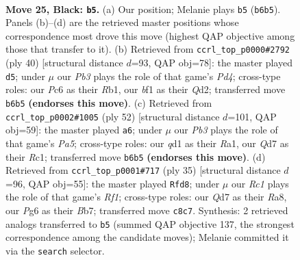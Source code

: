 \documentclass[11pt]{article}
\begin{document}
\clearpage

\begin{figure}[p]\centering
\begin{subfigure}{0.46\textwidth}\centering
\resizebox{\linewidth}{!}{%
\newchessgame
\chessboard[
  setfen={r1r2k2/pb1qb2p/npp3pP/3p1pP1/P2P1P2/1P2P1N1/8/R2QKBNR b KQ - 20 25},
  showmover=false,
  pgfstyle=straightmove, color=movearrow, markmove={b6-b5}
]}
\caption{}
\end{subfigure}\hfill
\begin{subfigure}{0.46\textwidth}\centering
\resizebox{\linewidth}{!}{%
\newchessgame
\chessboard[
  setfen={1nkr3r/2p2p2/bpqpp3/p5pn/2PPP2p/1NP2P1P/3QBBP1/1R2R1K1 w - - 1 21},
  showmover=false,
  pgfstyle=straightmove, color=movearrow, markmove={d4-d5}
]}
\caption{}
\end{subfigure}
\\[4pt]
\begin{subfigure}{0.46\textwidth}\centering
\resizebox{\linewidth}{!}{%
\newchessgame
\chessboard[
  setfen={2r1brk1/pp2q3/4p3/PPPpPn1p/5Pp1/2Q1p3/1B2B1PP/R1R3K1 w - - 1 27},
  showmover=false,
  pgfstyle=straightmove, color=movearrow, markmove={a5-a6}
]}
\caption{}
\end{subfigure}\hfill
\begin{subfigure}{0.46\textwidth}\centering
\resizebox{\linewidth}{!}{%
\newchessgame
\chessboard[
  setfen={r4rk1/1b2qpb1/pP2p1pp/2ppP3/5PPP/2NBP2R/PP1Q4/2KR4 b - - 0 18},
  showmover=false,
  pgfstyle=straightmove, color=movearrow, markmove={f8-d8}
]}
\caption{}
\end{subfigure}
\caption{\textbf{Move 25, Black: \texttt{b5}.} (a) Our position; Melanie plays \texttt{b5} (\texttt{b6b5}). Panels (b)--(d) are the retrieved master positions whose correspondence most drove this move (highest QAP objective among those that transfer to it). (b) Retrieved from \texttt{ccrl\_top\_p0000\#2792} (ply 40) [structural distance $d$=93, QAP obj=78]: the master played \texttt{d5}; under $\mu$ our \emph{Pb3} plays the role of that game's \emph{Pd4}; cross-type roles: our \emph{P}c6 as their \emph{R}b1, our \emph{b}f1 as their \emph{Q}d2; transferred move \texttt{b6b5} \textbf{(endorses this move)}. (c) Retrieved from \texttt{ccrl\_top\_p0002\#1005} (ply 52) [structural distance $d$=101, QAP obj=59]: the master played \texttt{a6}; under $\mu$ our \emph{Pb3} plays the role of that game's \emph{Pa5}; cross-type roles: our \emph{q}d1 as their \emph{R}a1, our \emph{Q}d7 as their \emph{R}c1; transferred move \texttt{b6b5} \textbf{(endorses this move)}. (d) Retrieved from \texttt{ccrl\_top\_p0001\#717} (ply 35) [structural distance $d$=96, QAP obj=55]: the master played \texttt{Rfd8}; under $\mu$ our \emph{Rc1} plays the role of that game's \emph{Rf1}; cross-type roles: our \emph{Q}d7 as their \emph{R}a8, our \emph{P}g6 as their \emph{B}b7; transferred move \texttt{c8c7}. Synthesis: 2 retrieved analogs transferred to \texttt{b5} (summed QAP objective 137, the strongest correspondence among the candidate moves); Melanie committed it via the \texttt{search} selector.}
\label{fig:thought-m49}
\end{figure}
\end{document}
